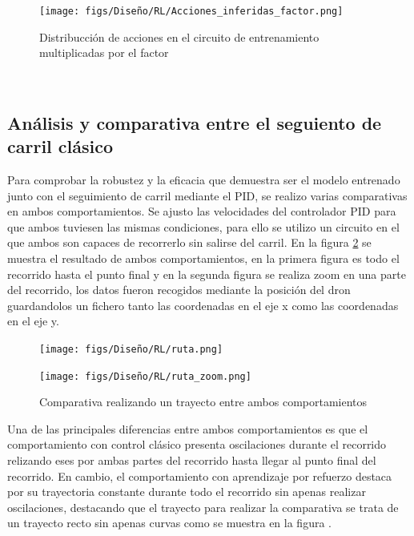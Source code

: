 \begin{figure} [H]
  \begin{center}
    \texttt{[image: figs/Diseño/RL/Acciones\_inferidas\_factor.png]}
  \end{center}
  \caption{Distribucción de acciones en el circuito de entrenamiento multiplicadas por el factor}
  \label{fig:inferencia_factor}
\end{figure}\


\subsection{Análisis y comparativa entre el seguiento de carril clásico}
\label{sec:Análisis y comparativa entre el seguiento de carril clásico}
Para comprobar la robustez y la eficacia que demuestra ser el modelo entrenado junto con el seguimiento de carril mediante el PID, se realizo varias comparativas en ambos
comportamientos. Se ajusto las velocidades del controlador PID para que ambos tuviesen las mismas condiciones, para ello se utilizo un circuito en el que ambos son capaces 
de recorrerlo sin salirse del carril. En la figura \ref{fig:comparativa} se muestra el resultado de ambos comportamientos, en la primera figura es todo el recorrido hasta el punto
final y en la segunda figura se realiza zoom en una parte del recorrido, los datos fueron recogidos mediante la posición del dron guardandolos un fichero tanto las coordenadas 
en el eje x como las coordenadas en el eje y. 
  
\begin{figure}[H]
  \centering
  \begin{minipage}{1.0\textwidth}
    \texttt{[image: figs/Diseño/RL/ruta.png]}
  \end{minipage}
  \hfill
  \begin{minipage}{1.0\textwidth}
    \texttt{[image: figs/Diseño/RL/ruta\_zoom.png]}
  \end{minipage}
  \caption{Comparativa realizando un trayecto entre ambos comportamientos}
  \label{fig:comparativa}
\end{figure}

Una de las principales diferencias entre ambos comportamientos es que el comportamiento con control clásico presenta oscilaciones durante el recorrido relizando eses 
por ambas partes del recorrido hasta llegar al punto final del recorrido. En cambio, el comportamiento con aprendizaje por refuerzo destaca por su trayectoria constante 
durante todo el recorrido sin apenas realizar oscilaciones, destacando que el trayecto para realizar la comparativa se trata de un trayecto recto sin apenas curvas como 
se muestra en la figura . 

